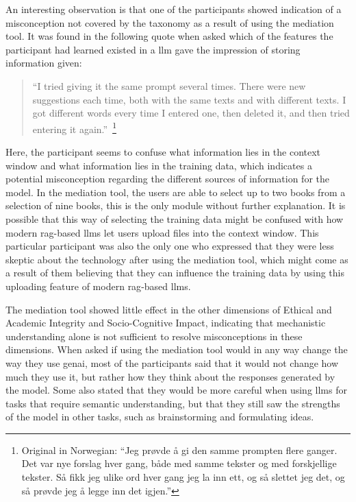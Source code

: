 An interesting observation is that one of the participants showed indication of a misconception not covered by the taxonomy as a result of using the mediation tool. It was found in the following quote when asked which of the features the participant had learned existed in a \gls{llm} gave the impression of storing information given:
\begin{quote}
``I tried giving it the same prompt several times. There were new suggestions each time, both with the same texts and with different texts. I got different words every time I entered one, then deleted it, and then tried entering it again.''~\footnote{Original in Norwegian: ``Jeg prøvde å gi den samme prompten flere ganger. Det var nye forslag hver gang, både med samme tekster og med forskjellige tekster. Så fikk jeg ulike ord hver gang jeg la inn ett, og så slettet jeg det, og så prøvde jeg å legge inn det igjen.''}
\end{quote}
Here, the participant seems to confuse what information lies in the context window and what information lies in the training data, which indicates a potential misconception regarding the different sources of information for the model. In the mediation tool, the users are able to select up to two books from a selection of nine books, this is the only module without further explanation. It is possible that this way of selecting the training data might be confused with how modern \gls{rag}-based \gls{llms} let users upload files into the context window. This particular participant was also the only one who expressed that they were less skeptic about the technology after using the mediation tool, which might come as a result of them believing that they can influence the training data by using this uploading feature of modern \gls{rag}-based \gls{llms}.

The mediation tool showed little effect in the other dimensions of Ethical and Academic Integrity and Socio-Cognitive Impact, indicating that mechanistic understanding alone is not sufficient to resolve misconceptions in these dimensions. When asked if using the mediation tool would in any way change the way they use \gls{genai}, most of the participants said that it would not change how much they use it, but rather how they think about the responses generated by the model. Some also stated that they would be more careful when using \gls{llms} for tasks that require semantic understanding, but that they still saw the strengths of the model in other tasks, such as brainstorming and formulating ideas.

